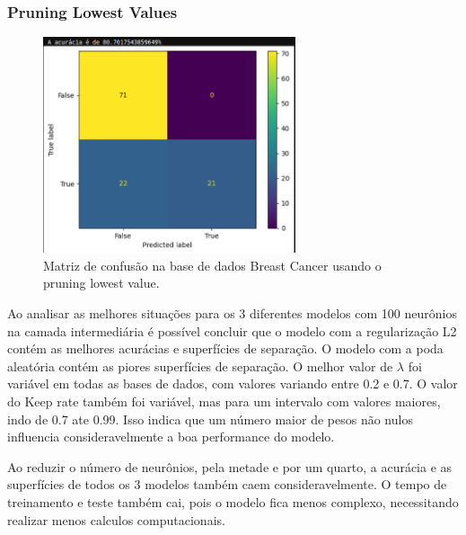 \documentclass{article}
\begin{document}
\newpage

\subsubsection*{Pruning Lowest Values}

\begin{figure}[h]

    \centering
    \includegraphics[height=2.5in]{conf_mat_plv_bcancer.png}
    \caption{Matriz de confusão na base de dados Breast Cancer usando o pruning lowest value.}
    \label{fig:example}
    
\end{figure}

\vspace{25pt}

Ao analisar as melhores situações para os 3 diferentes modelos com 100 neurônios na camada intermediária é possível concluir que o modelo com a regularização L2 contém as melhores acurácias e superfícies de separação. O modelo com a poda aleatória contém as piores superfícies de separação. O melhor valor de $\lambda$ foi variável em todas as bases de dados, com valores variando entre 0.2 e 0.7. O valor do Keep rate também foi variável, mas para um intervalo com valores maiores, indo de 0.7 ate 0.99. Isso indica que um número maior de pesos não nulos influencia consideravelmente a boa performance do modelo.

\vspace{25pt}

Ao reduzir o número de neurônios, pela metade e por um quarto, a acurácia e as superfícies de todos os 3 modelos também caem consideravelmente. O tempo de treinamento e teste também cai, pois o modelo fica menos complexo, necessitando realizar menos calculos computacionais.

\vspace{15pt}
\end{document}
